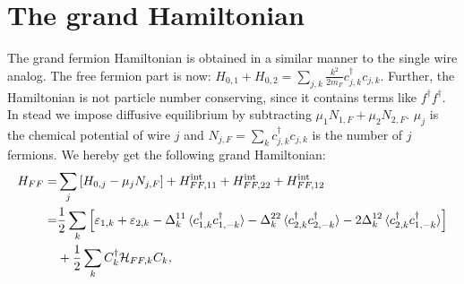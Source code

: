 \section{The grand Hamiltonian}
\label{sec.2wiresgrandHFF}
The grand fermion Hamiltonian is obtained in a similar manner to the single wire analog. The free fermion part is now: $H_{0,1}+H_{0,2} = \sum_{j,k}\frac{k^2}{2m_F}c^\dagger_{j,k}c_{j,k}$. Further, the Hamiltonian is not particle number conserving, since it contains terms like $f^\dagger f^\dagger$. In stead we impose diffusive equilibrium by subtracting $\mu_1N_{1,F}+\mu_2N_{2,F}$. $\mu_j$ is the chemical potential of wire $j$ and $N_{j,F} = \sum_k c^\dagger_{j,k}c_{j,k}$ is the number of $j$ fermions. We hereby get the following grand Hamiltonian:
\begin{align}
H_{FF} = &\sum_j \left[H_{0,j} - \mu_j N_{j,F}\right] + H^\text{int}_{FF,11} + H^\text{int}_{FF,22} + H^\text{int}_{FF,12} \nonumber \\
       = &\frac{1}{2}\sum_k\left[\varepsilon_{1,k} + \varepsilon_{2,k} - \Delta^{11}_k\braket{c^\dagger_{1,k}c^\dagger_{1,-k}} - \Delta^{22}_k\braket{c^\dagger_{2,k}c^\dagger_{2,-k}} - 2\Delta^{12}_k\braket{c^\dagger_{2,k}c^\dagger_{1,-k}} \right] \nonumber \\
       & + \frac{1}{2}\sum_k C^\dagger_k \mathcal{H}_{FF,k}C_k,
\end{align}

